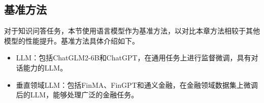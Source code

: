 


\subsection{基准方法}

对于知识问答任务，本节使用语言模型作为基准方法，以对比本章方法相较于其他模型的性能提升。基准方法具体介绍如下。

\begin{itemize}[topsep = 0 pt, itemsep= 0 pt, parsep=0pt, partopsep=0pt, leftmargin=36pt, itemindent=0pt, labelsep=6pt, listparindent=24pt]
	\item LLM：包括ChatGLM2-6B\cite{DBLP:conf/iclr/ZengLDWL0YXZXTM23}和ChatGPT\cite{DBLP:conf/nips/Ouyang0JAWMZASR22}，在通用任务上进行监督微调，具有对话能力的LLM。
	\item 垂直领域LLM：包括FinMA\cite{DBLP:journals/corr/abs-2306-05443}、FinGPT\cite{DBLP:journals/corr/abs-2306-06031}和通义金融\cite{DBLP:journals/corr/abs-2309-16609}，在金融领域数据集上微调后的LLM，能够处理广泛的金融任务。
\end{itemize}

